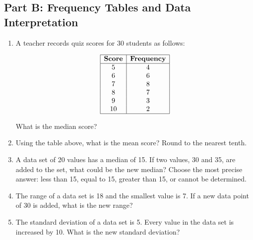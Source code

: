 \documentclass[14pt]{extarticle}
\begin{document}
\subsection*{Part B: Frequency Tables and Data Interpretation}
\begin{enumerate}
  \item A teacher records quiz scores for 30 students as follows:

  \[
  \begin{array}{|c|c|}
  \hline
  \textbf{Score} & \textbf{Frequency} \\
  \hline
  5 & 4 \\
  6 & 6 \\
  7 & 8 \\
  8 & 7 \\
  9 & 3 \\
  10 & 2 \\
  \hline
  \end{array}
  \]

  What is the median score?

  \item Using the table above, what is the mean score? Round to the nearest tenth.

  \item A data set of 20 values has a median of 15. If two values, 30 and 35, are added to the set, what could be the new median? Choose the most precise answer: less than 15, equal to 15, greater than 15, or cannot be determined.

  \item The range of a data set is 18 and the smallest value is 7. If a new data point of 30 is added, what is the new range?

  \item The standard deviation of a data set is 5. Every value in the data set is increased by 10. What is the new standard deviation?
\end{enumerate}
\end{document}
